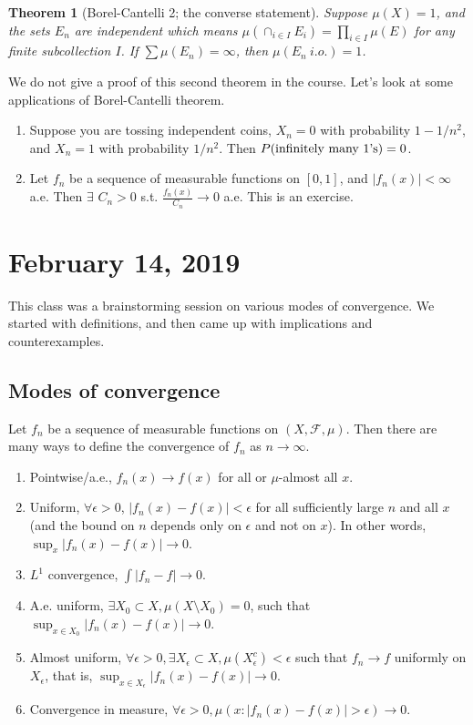 \documentclass{article}
\newtheorem{theorem}{Theorem}[section]
\theoremstyle{definition}
\begin{document}
\begin{theorem}[Borel-Cantelli 2; the converse statement]
	Suppose $\mu(X)=1$, and the sets $E_n$ are independent which means
	$\mu(\cap_{i\in I} E_i)=\prod_{i\in I} \mu(E)$ for any finite subcollection $I$.
	If
	$\sum \mu(E_n)=\infty$, then  $\mu(E_n \ i.o.)=1$.
\end{theorem}
We do not give a proof of this second theorem
in the course.
Let's look at some applications of Borel-Cantelli theorem.
\begin{enumerate}
	\item Suppose you are tossing independent coins, 
		$X_n=0$ with probability $1-1/n^2$,
		and $X_n=1$ with probability $1/n^2$.
		Then $P(\textnormal{infinitely many $1$'s})=0$.
	
	\item Let $f_n$ be a sequence of measurable functions on $[0,1]$, and $|f_n(x)|<\infty$ a.e.
		Then $\exists$ $C_n>0$ s.t. $\frac{f_n(x)}{C_n} \rightarrow 0$ a.e.
		This is an exercise.
\end{enumerate}

\section{February 14, 2019}

This class was a brainstorming session 
on various modes of convergence. 
We started with definitions, and then 
came up with implications and counterexamples.

\subsection{Modes of convergence}

Let $f_n$ be a sequence of measurable functions on $(X,\mathscr{F},\mu)$. Then there are many ways to define the convergence of $f_n$ as $n\rightarrow \infty$.

\begin{enumerate}[1.]
	\item Pointwise/a.e., $f_n(x)\rightarrow f(x)$ for all or $\mu$-almost all $x$.
	\item Uniform, $\forall \epsilon>0$, $|f_n(x)-f(x)|<\epsilon$ for all sufficiently large $n$
		and all $x$ (and the bound on $n$ depends only on $\epsilon$ and not on $x$).
		In other words, $\sup_{x}|f_n(x)-f(x)|\to0$.
	\item $L^1$ convergence, $\int |f_n-f| \rightarrow 0$.
	\item A.e. uniform, $\exists X_0\subset X,\mu(X\setminus X_0)=0$, such that
		$\sup_{x\in X_0} |f_n(x)-f(x)|\rightarrow 0$.
	\item Almost uniform, $\forall \epsilon>0, 
		\exists X_{\epsilon}\subset X, \mu(X_{\epsilon}^{c})<\epsilon$ such that $f_n \rightarrow f$ uniformly on $X_{\epsilon}$, that is, $\sup_{x\in X_\epsilon}|f_n(x)-f(x)|\to0$.
	\item Convergence in measure, $\forall \epsilon>0, \mu(x:|f_n(x)-f(x)|>\epsilon)\rightarrow 0$.
\end{enumerate}
\end{document}
